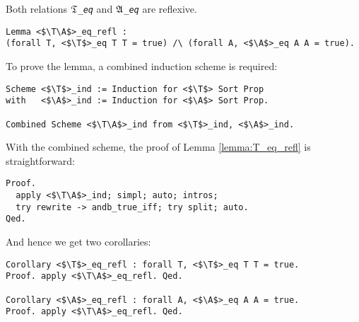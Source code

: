 
\begin{lemma}
\label{lemma:T_eq_refl}
Both relations \emph{$\mathfrak{T}$\texttt{\_eq}} and \emph{$\mathfrak{A}$\texttt{\_eq}} are reflexive.
\end{lemma}

\begin{verbatim}
Lemma <$\T\A$>_eq_refl :
(forall T, <$\T$>_eq T T = true) /\ (forall A, <$\A$>_eq A A = true).
\end{verbatim}

To prove the lemma, a combined induction scheme is required:

\begin{verbatim}
Scheme <$\T$>_ind := Induction for <$\T$> Sort Prop
with   <$\A$>_ind := Induction for <$\A$> Sort Prop.

Combined Scheme <$\T\A$>_ind from <$\T$>_ind, <$\A$>_ind.
\end{verbatim}

With the combined scheme, the proof of Lemma \ref{lemma:T_eq_refl} is straightforward:

\begin{verbatim}
Proof.
  apply <$\T\A$>_ind; simpl; auto; intros;
  try rewrite -> andb_true_iff; try split; auto.
Qed.
\end{verbatim}

And hence we get two corollaries:

\begin{verbatim}
Corollary <$\T$>_eq_refl : forall T, <$\T$>_eq T T = true.
Proof. apply <$\T\A$>_eq_refl. Qed.

Corollary <$\A$>_eq_refl : forall A, <$\A$>_eq A A = true.
Proof. apply <$\T\A$>_eq_refl. Qed.
\end{verbatim}

